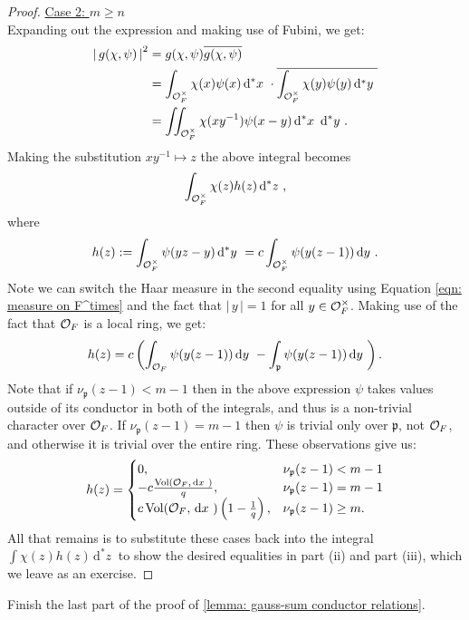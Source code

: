\documentclass[11pt, x11names]{book}
\newcommand{\pp}{\mathfrak{p}}
\renewcommand{\bar}[1]{\overline{#1}}
\renewcommand{\brack}[1]{\left(   #1 \right)}
\newcommand{\abs}[1]{\left| \, #1  \,\right|}
\newcommand{\inv}[1]{#1^{-1}}
\newcommand{\dx}{\, \mathrm{d}x \ }
\newcommand{\dy}{\, \mathrm{d}y \ }
\renewcommand{\d}[1]{\, \mathrm{d}#1 \ }
\DeclareMathOperator{\vol}{Vol}
\begin{document}
\begin{proof}
\underline{Case 2: $m \geq n$}\\
Expanding out the expression and making use of Fubini, we get:
\begin{align*}
    \abs{g(\chi, \psi)}^2 &= g(\chi, \psi) \bar{g(\chi, \psi)}\\
    &= \int_{\calo_F^\times} \chi(x) \psi(x) \d{^*x} \cdot \bar{\int_{\calo_F^\times} \chi(y) \psi(y) \d{^*y}}\\
    &= \iint_{\calo_F^\times} \chi(x\inv{y})\psi(x-y)  \d{^*x} \d{^*y}.
\end{align*}
Making the substitution $x\inv{y} \mapsto z$ the above integral becomes
\begin{equation*}
    \int_{\calo_F^\times} \chi(z) h(z) \d{^*z},
\end{equation*}
where 
\begin{equation*}
    h(z) := \int_{\calo_F^\times} \psi(yz - y)\d{^*y} = c \int_{\calo_F^\times} \psi(y(z-1)) \dy.
\end{equation*}
Note we can switch the Haar measure in the second equality using Equation \ref{eqn: measure on F^times} and the fact that $\abs{y} = 1$ for all $y \in \mathcal{O}_F^\times$. Making use of the fact that $\mathcal{O}_F$ is a local ring, we get:
\begin{equation*}
    h(z) = c \brack{\int_{\calo_F} \psi(y(z - 1)) \dy - \int_\pp \psi(y(z - 1)) \dy}.
\end{equation*}
Note that if $\nu_\pp(z-1)  <  m-1$ then in the above expression $\psi$ takes values outside of its conductor in both of the integrals, and thus is a non-trivial character over $\mathcal{O}_F$. If $\nu_\pp(z-1) = m - 1$ then $\psi$ is trivial only over $\pp$, not $\mathcal{O}_F$, and otherwise it is trivial over the entire ring. These observations give us:
\begin{equation*}
    h(z) = \begin{cases}
        0, & \nu_\pp(z-1) < m-1\\
        -c\frac{\vol(\calo_F, \dx)}{q}, & \nu_\pp(z-1) = m-1\\
        c\vol(\calo_F, \dx)\brack{1 - \frac{1}{q}}, &   \nu_\pp(z-1) \geq m.
    \end{cases}
\end{equation*}
All that remains is to substitute these cases back into the integral $\int \chi(z)h(z) \d{^*z}$ to show the desired equalities in part (ii) and part (iii), which we leave as an exercise.
\end{proof}


\begin{exercise}
\label{exercise: last part of gauss-sum conductor proof}
Finish the last part of the proof of \ref{lemma: gauss-sum conductor relations}.
\end{exercise}
\end{document}

